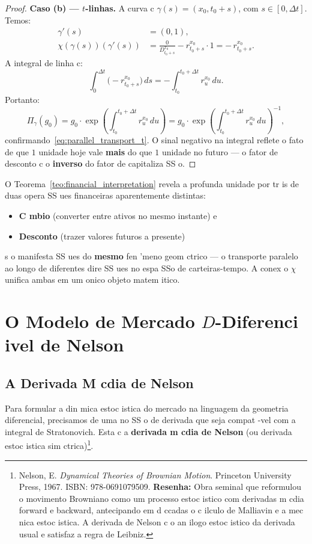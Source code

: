 {\begin{proof}
\textbf{Caso (b) --- $t$-linhas.} A curva c $\gamma(s) = (x_0, t_0 +
s)$, com $s \in [0, \Delta t]$. Temos:
\begin{align*}
 \gamma'(s) &= (0, 1), \\
 \chi(\gamma(s))(\gamma'(s))
 &= \frac{0}{D_{t_0+s}^{x_0}} - r_{t_0+s}^{x_0} \cdot 1
 = -\,r_{t_0+s}^{x_0}.
\end{align*}
A integral de linha c:
\[
\int_0^{\Delta t} \bigl(-r_{t_0+s}^{x_0}\bigr)\,ds
= -\int_{t_0}^{t_0+\Delta t} r_u^{x_0}\,du.
\]
Portanto:
\[
\Pi_\gamma(g_0) = g_0 \cdot \exp\!\left(\int_{t_0}^{t_0+\Delta t} r_u^{x_0}\,du\right)
= g_0 \cdot \exp\!\left(\int_{t_0}^{t_0+\Delta t} r_u^{x_0}\,du\right)^{-1},
\]
confirmando~\eqref{eq:parallel_transport_t}. O sinal negativo na
integral reflete o fato de que $1$ unidade hoje vale \textbf{mais} do
que $1$ unidade no futuro --- o fator de desconto c o \textbf{inverso}
do fator de capitaliza SS o.
\end{proof}

\begin{obs}
O Teorema~\ref{teo:financial_interpretation} revela a profunda unidade
por tr is de duas opera SS ues financeiras aparentemente distintas:
\begin{itemize}
 \item \textbf{C mbio} (converter entre ativos no mesmo instante) e
 \item \textbf{Desconto} (trazer valores futuros a presente)
\end{itemize}
s o manifesta SS ues do \textbf{mesmo} fen 'meno geom ctrico --- o
transporte paralelo ao longo de diferentes dire SS ues no espa SSo de
carteiras-tempo. A conex o $\chi$ unifica ambas em um onico objeto
matem itico.
\end{obs}

\section{O Modelo de Mercado $D$-Diferenci ivel de Nelson}

\subsection{A Derivada M cdia de Nelson}

Para formular a din mica estoc istica do mercado na linguagem da
geometria diferencial, precisamos de uma no SS o de derivada que seja
compat -vel com a integral de Stratonovich. Esta c a \textbf{derivada
m cdia de Nelson} (ou derivada estoc istica sim ctrica)\footnote{Nelson, E.
\textit{Dynamical Theories of Brownian Motion}. Princeton University
Press, 1967. ISBN: 978-0691079509. \textbf{Resenha:} Obra seminal que
reformulou o movimento Browniano como um processo estoc istico com
derivadas m cdia forward e backward, antecipando em d ccadas o c ilculo de
Malliavin e a mec nica estoc istica. A derivada de Nelson c o an ilogo
estoc istico da derivada usual e satisfaz a regra de Leibniz.}.

}
